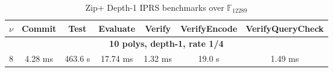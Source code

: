 \begin{table}[ht]
\centering
\caption{Zip+ Depth-1 IPRS benchmarks over $\mathbb{F}_{12289}$}
\label{tab:depth1-benchmarks}
\begin{tabular}{c|cccccc}
\toprule
$\nu$ & Commit & Test & Evaluate & Verify & VerifyEncode & VerifyQueryCheck \\
\midrule
\multicolumn{7}{c}{\textbf{10 polys, depth-1, rate 1/4}} \\
\midrule
  8 & 4.28 ms & 463.6 \textmu{}s & 17.74 ms & 1.32 ms & 19.0 \textmu{}s & 1.49 ms \\
\bottomrule
\end{tabular}
\end{table}

